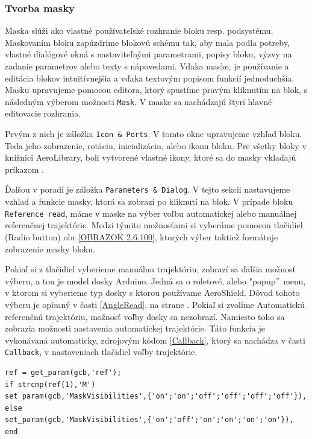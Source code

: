 \newpage
\subsubsection{Tvorba masky}
\label{Maska}

Maska slúži ako vlastné používateľské rozhranie bloku resp. podsystému. Maskovaním bloku zapúzdrime blokovú schému tak, aby mala podla potreby, vlastné dialógové okná s nastaviteľnými parametrami, popisy bloku, výzvy na zadanie parametrov alebo texty s nápovedami. Vďaka maske, je používanie a editácia blokov intuitívnejšia a vďaka textovým popisom funkcií jednoduchšia. Masku upravujeme pomocou editora, ktorý spustíme pravým kliknutím na blok, s následným výberom možnosti \verb|Mask|. V maske sa nachádzajú štyri hlavné editovacie rozhrania. 

Prvým z nich je záložka \verb|Icon & Ports|. V tomto okne upravujeme vzhľad bloku. Teda jeho zobrazenie, rotáciu, inicializáciu, alebo ikonu bloku. Pre všetky bloky v knižnici AeroLibrary, boli vytvorené vlastné ikony, ktoré sa do masky vkladajú príkazom .

Ďalšou v poradí je záložka \verb|Parameters & Dialog|. V tejto sekcii nastavujeme vzhľad a funkcie masky, ktorá sa zobrazí po kliknutí na blok. V prípade bloku \verb|Reference read|, máme v maske na výber voľbu automatickej alebo manuálnej referenčnej trajektórie. Medzi týmito možnosťami si vyberáme pomocou tlačidiel (Radio button) obr.\ref{OBRAZOK 2.6.100}, ktorých výber taktiež formátuje zobrazenie masky bloku. 

Pokiaľ si z tlačidiel vyberieme manuálnu trajektóriu, zobrazí sa ďalšia možnosť výberu, a tou je model dosky Arduino. Jedná sa o roletové, alebo "popup$"$ menu, v ktorom si vyberieme typ dosky s ktorou používame AeroShield. Dôvod tohoto výberu je opísaný v časti \ref{AngleRead}, na strane \pageref{AngleRead}. Pokiaľ si zvolíme Automatickú referenčnú trajektóriu, možnosť voľby dosky sa nezobrazí. Namiesto toho sa zobrazia možnosti nastavenia automatickej trajektórie. Táto funkcia je vykonávaná automaticky, zdrojovým kódom \ref{Callback}, ktorý sa nachádza v časti \verb|Callback|, v nastaveniach tlačidiel voľby trajektórie. 

\begin{lstlisting}[caption={Callback funkcia.},captionpos=b,label=Callback]
ref = get_param(gcb,'ref');
if strcmp(ref(1),'M')
set_param(gcb,'MaskVisibilities',{'on';'on';'off';'off';'off';'off'}),
else
set_param(gcb,'MaskVisibilities',{'on';'off';'on';'on';'on';'on'}),
end
\end{lstlisting}


